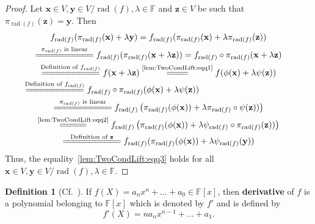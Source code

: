 \documentclass{elsarticle}
\DeclareMathOperator{\rad}{rad}
\def\F{{\mathbb F}}
\theoremstyle{definition}
\newtheorem{definition}[theorem]{Definition}
\numberwithin{equation}{section}
\begin{document}
\begin{proof}Let $\mathbf x \in V, \mathbf y \in V/\rad(f), \lambda \in \F$ and $\mathbf z \in V$ be such that $\pi_{\rad(f)}(\mathbf z) = \mathbf y.$
Then
\begin{multline*}
f_{\rad(f)}(\pi_{\rad(f)}(\mathbf x) + \lambda \mathbf y) = f_{\rad(f)}(\pi_{\rad(f)}(\mathbf x) + \lambda \pi_{\rad(f)}(\mathbf z))\\
 \overset{\scriptsize\mbox{$\pi_{\rad(f)}$ is linear}}{=\joinrel=\joinrel=\joinrel=\joinrel=\joinrel=\joinrel=\joinrel=\joinrel=\joinrel=\joinrel=} f_{\rad(f)}(\pi_{\rad(f)}(\mathbf x + \lambda \mathbf z))
 = f_{\rad(f)}\circ \pi_{\rad(f)}(\mathbf x + \lambda \mathbf z)\\
\overset{\scriptsize\mbox{Definition of $f_{\rad(f)}$}}{=\joinrel=\joinrel=\joinrel=\joinrel=\joinrel=\joinrel=\joinrel=\joinrel=\joinrel=\joinrel=}
f(\mathbf x + \lambda \mathbf z)
\overset{\scriptsize\mbox{\eqref{lem:TwoCondLift:eqq1}}}{=\joinrel=\joinrel=\joinrel=}
f(\phi(\mathbf x) + \lambda \psi(\mathbf z))\\
\overset{\scriptsize\mbox{Definition of $f_{\rad(f)}$}}{=\joinrel=\joinrel=\joinrel=\joinrel=\joinrel=\joinrel=\joinrel=\joinrel=\joinrel=\joinrel=}
f_{\rad(f)}\circ \pi_{\rad(f)}(\phi(\mathbf x) + \lambda \psi(\mathbf z))\phantom{XXXXXXXXXXXX}\\
\overset{\scriptsize\mbox{$\pi_{\rad(f)}$ is linear}}{=\joinrel=\joinrel=\joinrel=\joinrel=\joinrel=\joinrel=\joinrel=\joinrel=\joinrel=\joinrel=}
f_{\rad(f)}\left(\pi_{\rad(f)} (\phi(\mathbf x)) + \lambda \pi_{\rad(f)}\circ \psi(\mathbf z))\right)\\
\overset{\scriptsize\mbox{\eqref{lem:TwoCondLift:eqq2}}}{=\joinrel=\joinrel=\joinrel=\joinrel=}
f_{\rad(f)}\left(\pi_{\rad(f)} (\phi(\mathbf x)) + \lambda \psi_{\rad(f)} \circ  \pi_{\rad(f)}(\mathbf z))\right)\\
\overset{\scriptsize\mbox{Definition of $\mathbf z$}}{=\joinrel=\joinrel=\joinrel=\joinrel=\joinrel=\joinrel=\joinrel=\joinrel=\joinrel=\joinrel=}
 f_{\rad(f)}(\pi_{\rad(f)}(\phi(\mathbf x)) + \lambda \psi_{\rad(f)}(\mathbf y))
\end{multline*} 
Thus, the equality~\eqref{lem:TwoCondLift:eqq3} holds for all $\mathbf x \in V, \mathbf y \in V/\rad(f), \lambda \in \F$.
\end{proof}

\begin{definition}[{Cf.~\cite[IV,\S 1, the definition on p.~178]{Lang2002}}]\label{def:onedimder}If $f(X) =
a_n x^n + \ldots + a_0 \in \F[x]$, then \textbf{derivative} of $f$ is a polynomial belonging to $\F[x]$ which is denoted by $f'$ and is defined by
\[
f'(X)= na_n x^{n-1} + \ldots + a_1.
\]
\end{definition}
\end{document}

